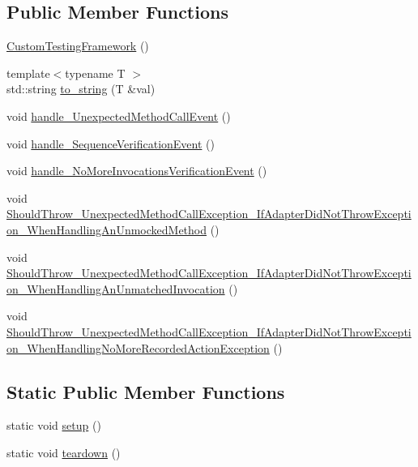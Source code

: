 \subsection*{Public Member Functions}
\begin{DoxyCompactItemize}
\item 
\mbox{\hyperlink{structCustomTestingFramework_a9131d3d1c566cd56bc9a78269379d4f6}{Custom\+Testing\+Framework}} ()
\item 
{\footnotesize template$<$typename T $>$ }\\std\+::string \mbox{\hyperlink{structCustomTestingFramework_ab5c90c5c9377466645c1a827e87d3780}{to\+\_\+string}} (T \&val)
\item 
void \mbox{\hyperlink{structCustomTestingFramework_a35cbf545603db31d6620ec6363f5fcea}{handle\+\_\+\+Unexpected\+Method\+Call\+Event}} ()
\item 
void \mbox{\hyperlink{structCustomTestingFramework_a0595287c7dc82569e70d6a2698ec3a4b}{handle\+\_\+\+Sequence\+Verification\+Event}} ()
\item 
void \mbox{\hyperlink{structCustomTestingFramework_a7b61471a57675b5c629802a814ec424d}{handle\+\_\+\+No\+More\+Invocations\+Verification\+Event}} ()
\item 
void \mbox{\hyperlink{structCustomTestingFramework_a58f5ddc2bb0764475d9a963e92b5edc7}{Should\+Throw\+\_\+\+Unexpected\+Method\+Call\+Exception\+\_\+\+If\+Adapter\+Did\+Not\+Throw\+Exception\+\_\+\+When\+Handling\+An\+Unmocked\+Method}} ()
\item 
void \mbox{\hyperlink{structCustomTestingFramework_abb7fa9135f0dd70ec0160a16bbca1512}{Should\+Throw\+\_\+\+Unexpected\+Method\+Call\+Exception\+\_\+\+If\+Adapter\+Did\+Not\+Throw\+Exception\+\_\+\+When\+Handling\+An\+Unmatched\+Invocation}} ()
\item 
void \mbox{\hyperlink{structCustomTestingFramework_a3e372491e2ea5796076251852db31e5b}{Should\+Throw\+\_\+\+Unexpected\+Method\+Call\+Exception\+\_\+\+If\+Adapter\+Did\+Not\+Throw\+Exception\+\_\+\+When\+Handling\+No\+More\+Recorded\+Action\+Exception}} ()
\end{DoxyCompactItemize}
\subsection*{Static Public Member Functions}
\begin{DoxyCompactItemize}
\item 
static void \mbox{\hyperlink{structCustomTestingFramework_ae47d4b8fad0b7b455aec7e37484a3b49}{setup}} ()
\item 
static void \mbox{\hyperlink{structCustomTestingFramework_adbd09642fcc399a78a93df95942a0844}{teardown}} ()
\end{DoxyCompactItemize}
